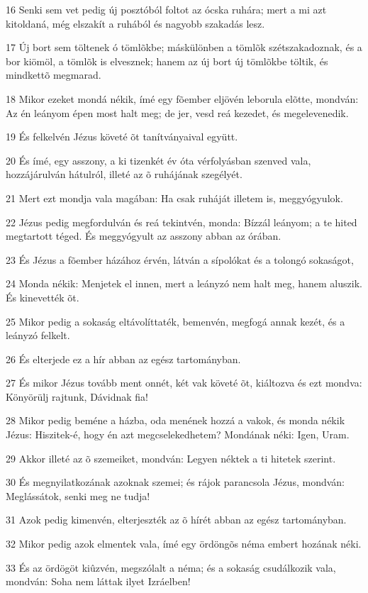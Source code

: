 \par 16 Senki sem vet pedig új posztóból foltot az ócska ruhára; mert a mi azt kitoldaná, még elszakít a ruhából és nagyobb szakadás lesz.
\par 17 Új bort sem töltenek ó tömlõkbe; máskülönben a tömlõk szétszakadoznak, és a bor kiömöl, a tömlõk is elvesznek; hanem az új bort új tömlõkbe töltik, és mindkettõ megmarad.
\par 18 Mikor ezeket mondá nékik, ímé egy fõember eljövén leborula elõtte, mondván: Az én leányom épen most halt meg; de jer, vesd reá kezedet, és megelevenedik.
\par 19 És felkelvén Jézus követé õt tanítványaival együtt.
\par 20 És ímé, egy asszony, a ki tizenkét év óta vérfolyásban szenved vala, hozzájárulván hátulról, illeté az õ ruhájának szegélyét.
\par 21 Mert ezt mondja vala magában: Ha csak ruháját illetem is, meggyógyulok.
\par 22 Jézus pedig megfordulván és reá tekintvén, monda: Bízzál leányom; a te hited megtartott téged. És meggyógyult az asszony abban az órában.
\par 23 És Jézus a fõember házához érvén, látván a sípolókat és a tolongó sokaságot,
\par 24 Monda nékik: Menjetek el innen, mert a leányzó nem halt meg, hanem aluszik. És kinevették õt.
\par 25 Mikor pedig a sokaság eltávolíttaték, bemenvén, megfogá annak kezét, és a leányzó felkelt.
\par 26 És elterjede ez a hír abban az egész tartományban.
\par 27 És mikor Jézus tovább ment onnét, két vak követé õt, kiáltozva és ezt mondva: Könyörülj rajtunk, Dávidnak fia!
\par 28 Mikor pedig beméne a házba, oda menének hozzá a vakok, és monda nékik Jézus: Hiszitek-é, hogy én azt megcselekedhetem? Mondának néki: Igen, Uram.
\par 29 Akkor illeté az õ szemeiket, mondván: Legyen néktek a ti hitetek szerint.
\par 30 És megnyilatkozának azoknak szemei; és rájok parancsola Jézus, mondván: Meglássátok, senki meg ne tudja!
\par 31 Azok pedig kimenvén, elterjeszték az õ hírét abban az egész tartományban.
\par 32 Mikor pedig azok elmentek vala, ímé egy ördöngõs néma embert hozának néki.
\par 33 És az ördögöt kiûzvén, megszólalt a néma; és a sokaság csudálkozik vala, mondván: Soha nem láttak ilyet Izráelben!
